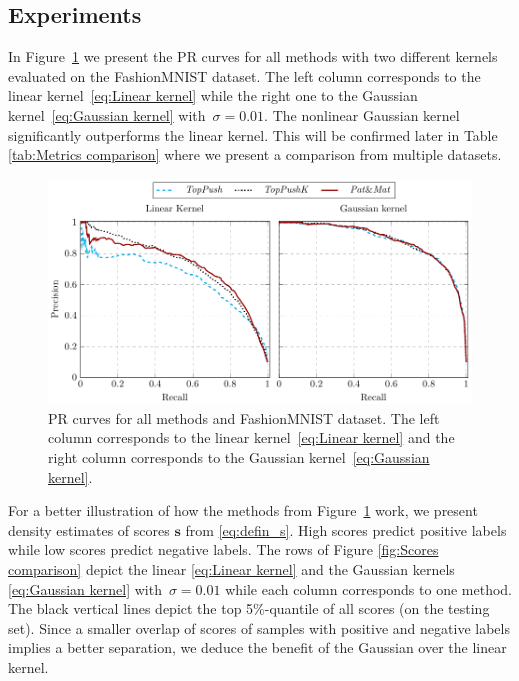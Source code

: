 \subsection{Experiments}

In Figure~\ref{fig:PR comparison} we present the PR curves for all methods with two different kernels evaluated on the FashionMNIST dataset. The left column corresponds to the linear kernel~\eqref{eq:Linear kernel} while the right one to the Gaussian kernel~\eqref{eq:Gaussian kernel} with~$\sigma = 0.01$. The nonlinear Gaussian kernel significantly outperforms the linear kernel. This will be confirmed later in Table \ref{tab:Metrics comparison} where we present a comparison from multiple datasets. 

\begin{figure}[!ht]
  \centering
  \includegraphics[width = \linewidth]{images/dual_results1.pdf}
  \caption{PR curves for all methods and  FashionMNIST dataset. The left column corresponds to the linear kernel~\eqref{eq:Linear kernel} and the right column corresponds to the Gaussian kernel~\eqref{eq:Gaussian kernel}.}
  \label{fig:PR comparison}
\end{figure}

For a better illustration of how the methods from Figure~\ref{fig:PR comparison} work, we present density estimates of scores $\bm s$ from \eqref{eq:defin_s}. High scores predict positive labels while low scores predict negative labels. The rows of Figure \ref{fig:Scores comparison} depict the linear \eqref{eq:Linear kernel} and the Gaussian kernels \eqref{eq:Gaussian kernel} with~$\sigma = 0.01$ while each column corresponds to one method. The black vertical lines depict the top 5\%-quantile of all scores (on the testing set). Since a smaller overlap of scores of samples with positive and negative labels implies a better separation, we deduce the benefit of the Gaussian over the linear kernel.

